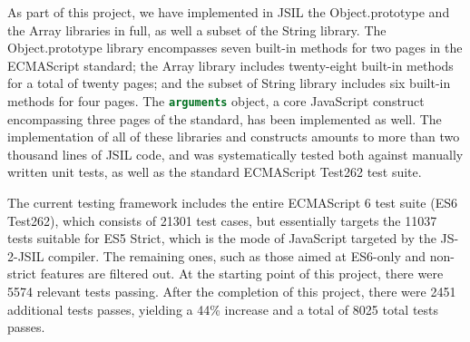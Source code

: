 \documentclass[a4paper,11pt,twoside]{report}
\def\jsinline{\lstinline[language=JavaScript, basicstyle=\small]}%\end{lstlisting}
\begin{document}

As part of this project, we have implemented in JSIL the Object.prototype and the Array libraries in full, as well a subset of the String library. The Object.prototype library encompasses seven built-in methods for two pages in the ECMAScript standard; the Array library includes twenty-eight built-in methods for a total of twenty pages; and the subset of String library includes six built-in methods for four pages. The \jsinline|arguments| object, a core JavaScript construct encompassing three pages of the standard, has been implemented as well. The implementation of all of these libraries and constructs amounts to more than two thousand lines of JSIL code, and was systematically tested both against manually written unit tests, as well as the standard ECMAScript Test262 test suite.

The current testing framework includes the entire ECMAScript 6 test suite (ES6 Test262), which consists of 21301 test cases, but essentially targets the 11037 tests suitable for ES5 Strict, which is the mode of JavaScript targeted by the JS-2-JSIL compiler. The remaining ones, such as those aimed at ES6-only and non-strict features are filtered out. At the starting point of this project, there were 5574 relevant tests passing. After the completion of this project, there were 2451 additional tests passes, yielding a 44\% increase and a total of 8025 total tests passes.

\end{document}
